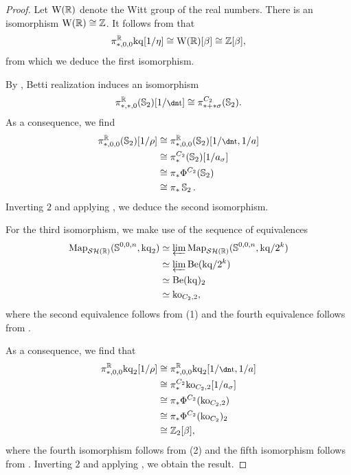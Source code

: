 \begin{proof}
  Let $\mathrm{W} (\mathbb{R})$ denote the Witt group of the real numbers. There is an isomorphism $\mathrm{W} (\mathbb{R}) \cong \mathbb{Z}$.
  It follows from \cite[Section 6.3.2]{etaPeriodic} that
  \[\pi_{*,0,0} ^{\mathbb{R}} \mathrm{kq}[1/\eta] \cong \mathrm{W} (\mathbb{R}) [\beta] \cong \mathbb{Z}[\beta],\]
  from which we deduce the first isomorphism.

  By , Betti realization induces an isomorphism 
  \[\pi_{*,*,0} ^{\R} (\Ss_2)[1/\ta] \cong \pi_{*+*\sigma} ^{C_2} (\Ss_2).\]
  As a consequence, we find
  \begin{align*}
    \pi_{*,0,0} ^{\R} (\Ss_2)[1/\rho]
    &\cong \pi_{*,0,0} ^{\R} (\Ss_2)[1/\ta, 1/a] \\
    &\cong \pi_{*} ^{C_2} (\Ss_2)[1/a_\sigma] \\
    &\cong \pi_* \Phi^{C_2} (\Ss_2) \\
    &\cong \pi_* \Ss_2.
  \end{align*}
  Inverting $2$ and applying , we deduce the second isomorphism.

  For the third isomorphism, we make use of the sequence of equivalences
  \begin{align*}
    \operatorname{\mathrm{Map}}_{\mathcal{SH}(\mathbb{R})} (\operatorname{\mathbb{S}}^{0,0,n}, \mathrm{kq}_2)
    &\simeq \varprojlim \operatorname{\mathrm{Map}}_{\mathcal{SH}(\mathbb{R})} (\operatorname{\mathbb{S}}^{0,0,n}, \mathrm{kq}/2^k) \\
    &\simeq \varprojlim \mathrm{Be}(\mathrm{kq}/2^k) \\
    &\simeq \mathrm{Be}(\mathrm{kq})_2 \\
    &\simeq \mathrm{ko}_{C_2,2},
  \end{align*}
  where the second equivalence follows from (1) and the fourth equivalence follows from \cite[Corollary 2.30]{Kong}.

  As a consequence, we find that
  \begin{align*}
    \pi_{*,0,0} ^\R \kq_2 [1/\rho] 
    &\cong \pi_{*,0,0} ^\R \kq_2 [1/\ta, 1/a] \\
    &\cong \pi_{*} ^{C_2} \ko_{C_2,2} [1/a_\sigma] \\
    &\cong \pi_{*} \Phi^{C_2} (\ko_{C_2,2}) \\
    &\cong \pi_* \Phi^{C_2} (\ko_{C_2})_2 \\
    &\cong \Z_2 [\beta],
  \end{align*}
  where the fourth isomorphism follows from (2) and the fifth isomorphism follows from \cite[Propositon 10.18]{koC2}.
  Inverting $2$ and applying , we obtain the result.
\end{proof}

